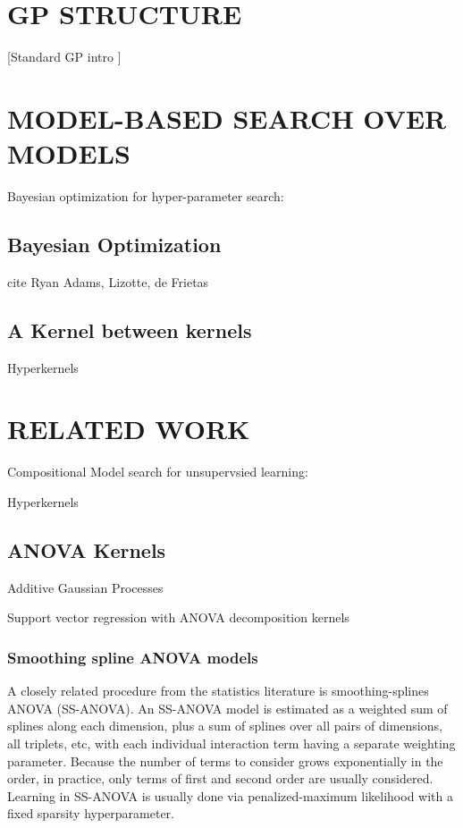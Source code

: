 \documentclass[twoside]{article}
\begin{document}
\section{GP STRUCTURE}

[Standard GP intro \cite{rasmussen38gaussian}]

\section{MODEL-BASED SEARCH OVER MODELS}

Bayesian optimization for hyper-parameter search: \cite{snoek2012practical}

\subsection{Bayesian Optimization}

cite Ryan Adams, Lizotte, de Frietas

\subsection{A Kernel between kernels}

Hyperkernels \cite{ong2002hyperkernels}


\section{RELATED WORK}

Compositional Model search for unsupervsied learning: \cite{grosse2012exploiting}



Hyperkernels \cite{ong2002hyperkernels}

\subsection{ANOVA Kernels}

Additive Gaussian Processes \cite{duvenaud2011additive11}

Support vector regression with ANOVA decomposition kernels \cite{stitson1999support}

\subsubsection{Smoothing spline ANOVA models}

A closely related procedure from the statistics literature is smoothing-splines ANOVA (SS-ANOVA)\cite{wahba1990spline, gu2002smoothing}. An SS-ANOVA model is estimated as a weighted sum of splines along each dimension, plus a sum of splines over all pairs of dimensions, all triplets, etc, with each individual interaction term having a separate weighting parameter.  Because the number of terms to consider grows exponentially in the order, in practice, only terms of first and second order are usually considered.  Learning in SS-ANOVA is usually done via penalized-maximum likelihood with a fixed sparsity hyperparameter.
\end{document}
